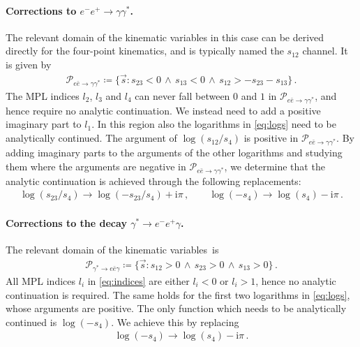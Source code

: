 \documentclass[main.tex]{subfiles}
\begin{document}
\smallskip

\paragraph{Corrections to $e^- e^+ \to \gamma \gamma^*$.} The relevant domain of the kinematic variables in this case can be derived directly for the four-point kinematics, and is typically named the $s_{12}$ channel. It is given by 
\begin{align}
\label{eq:region_eebar}
\mathcal{P}_{e\bar{e}\to\gamma\gamma^*} \coloneqq \{\vec{s} \colon s_{23} < 0 \, \land \, s_{13} < 0 \, \land \, s_{12} > - s_{23} - s_{13} \} \,.
\end{align}
The MPL indices $l_2$, $l_3$ and $l_4$ can never fall between $0$ and $1$ in $\mathcal{P}_{e\bar{e}\to\gamma\gamma^*}$, and hence require no analytic continuation. We instead need to add a positive imaginary part to $l_1$. 
In this region also the logarithms in \cref{eq:logs} need to be analytically continued. The argument of $\log(s_{12}/s_4)$ is positive in $\mathcal{P}_{e\bar{e}\to\gamma\gamma^*}$. By adding imaginary parts to the arguments of the other logarithms and studying them where the arguments are negative in $\mathcal{P}_{e\bar{e}\to\gamma\gamma^*}$, we determine that the analytic continuation is achieved through the following replacements:
\begin{align}
\log(s_{23}/s_4) \longrightarrow \log(-s_{23}/s_{4})+ \mathrm{i} \pi \,, \qquad  \log(-s_4) \longrightarrow \log(s_4)- \mathrm{i} \pi \,.
\end{align}


\paragraph{Corrections to the decay $\gamma^* \to e^- e^+ \gamma$.} The relevant domain of the kinematic variables~is
\begin{align}
\label{eq:region_decay}
\mathcal{P}_{\gamma^*\to e \bar{e} \gamma} \coloneqq  \{ \vec{s} \colon s_{12} > 0 \, \land \, s_{23} > 0 \, \land \,  s_{13} > 0 \} \,.
\end{align}
All MPL indices $l_i$ in \cref{eq:indices} are either $l_i < 0$ or $l_i > 1$, hence no analytic continuation is required. The same holds for the first two logarithms in \cref{eq:logs}, whose arguments are positive. The only function which needs to be analytically continued is $\log(-s_4)$. We achieve this by replacing
\begin{align}
\log(-s_4) \longrightarrow \log(s_{4}) - \mathrm{i} \pi \,.
\end{align}
\end{document}
